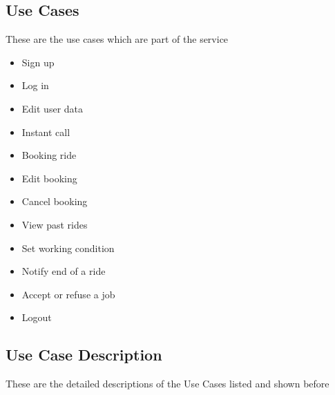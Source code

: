 \subsection{Use Cases}
These are the use cases which are part of the service
\begin{itemize}
	\item Sign up
	\item Log in
	\item Edit user data
	\item Instant call
	\item Booking ride
	\item Edit booking
	\item Cancel booking
	\item View past rides
	\item Set working condition
	\item Notify end of a ride
	\item Accept or refuse a job
	\item Logout


\end{itemize}



\newpage
\subsection{Use Case Description}
These are the detailed descriptions of the Use Cases listed and shown before


